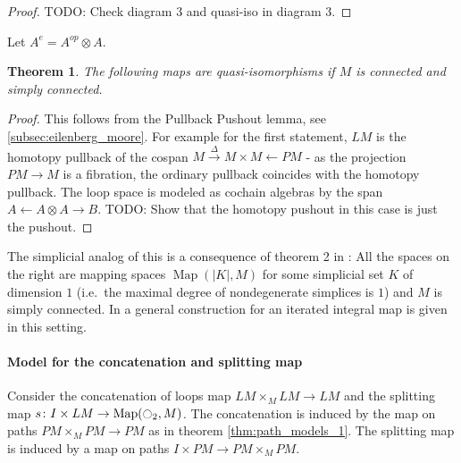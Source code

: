 \documentclass{scrartcl}
\theoremstyle{plain}
\newtheorem{theorem}{Theorem}[section]
\theoremstyle{definition}
\newcommand{\from}{\leftarrow}
\let\xto\xrightarrow
\DeclareMathOperator{\id}{id}
\DeclareMathOperator{\Map}{Map}
\begin{document}
\begin{proof}
TODO: Check diagram 3 and quasi-iso in diagram 3.
\end{proof}

Let $A^e=A^{op}\otimes A$. 

\begin{theorem}
    The following maps are quasi-isomorphisms if $M$ is connected and simply connected.
    \begin{center}
\end{center}

\end{theorem}
\begin{proof}
    This follows from the Pullback Pushout lemma, see \ref{subsec:eilenberg_moore}. For example for the first statement, $LM$ is the homotopy pullback of the cospan $M\xto{\Delta} M\times M\from PM$ - as the projection $PM\to M$ is a fibration, the ordinary pullback coincides with the homotopy pullback. The loop space is modeled as cochain algebras by the span $A\from A\otimes A \to B$. TODO: Show that the homotopy pushout in this case is just the pushout.
\end{proof}

The simplicial analog of this is a consequence of theorem 2 in \cite{patras2003cochain}: All the spaces on the right are mapping spaces $\Map(|K|, M)$ for some simplicial set $K$ of dimension $1$ (i.e.\ the maximal degree of nondegenerate simplices is $1$) and $M$ is simply connected. In \cite{patras2003cochain} a general construction for an iterated integral map is given in this setting. 


\paragraph{Model for the concatenation and splitting map} Consider the concatenation of loops map $LM\times_M LM\to LM$ and the splitting map $s\colon I\times LM\to \Map(\ocircle_2, M)$. The concatenation is induced by the map on paths $PM\times_M PM \to PM$ as in theorem \ref{thm:path_models_1}. The splitting map is induced by a map on paths $I\times PM \to PM\times_M PM$.
\end{document}
